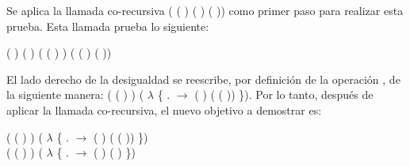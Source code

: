 \begin{AgdaAlign}
Se aplica la llamada co-recursiva ( ( ) ( )  ( )) como primer paso para realizar esta prueba. Esta llamada prueba lo siguiente: 
\begin{center}
\AgdaFunction{[}  \AgdaFunction{]}  (  \AgdaFunction{+}  ) ( ) \AgdaFunction{$\leq$} ( ( ) ) \AgdaFunction{+} ( ( ) ( ))
\end{center}

El lado derecho de la desigualdad se reescribe, por definición de la operación , de la siguiente manera:  ( ( ) ) \AgdaFunction{+} ( $\lambda$ \{ . $\rightarrow$  ( ) ( ( )) \}). Por lo tanto, después de aplicar la llamada co-recursiva, el nuevo objetivo a demostrar es:
\begin{center}
\AgdaFunction{[}  \AgdaFunction{]} ( ( ) ) \AgdaFunction{+} ( $\lambda$ \{ . $\rightarrow$  ( ) ( ( )) \}) \AgdaFunction{$\leq$} \\ ( ( ) ) \AgdaFunction{+} ( $\lambda$ \{ . $\rightarrow$  ( ) ( ) \})
\end{center}


\end{AgdaAlign}
